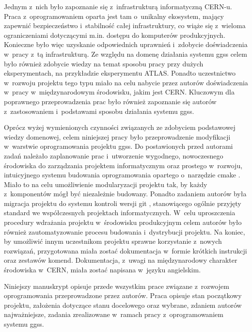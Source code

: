 Jednym z~nich było zapoznanie się z~infrastrukturą informatyczną CERN-u. Praca z~oprogramowaniem oparta jest tam o~unikalny ekosystem, mający zapewnić bezpieczeństwo i~stabilność całej infrastruktury, co wiąże się z~wieloma ograniczeniami dotyczącymi m.in. dostępu do komputerów produkcyjnych. Konieczne było więc uzyskanie odpowiednich uprawnień i~zdobycie doświadczenia w~pracy z~tą infrastrukturą. Ze względu na domenę działania systemu \gls*{ggss} celem było również zdobycie wiedzy na temat sposobu pracy przy dużych eksperymentach, na przykładzie eksperymentu ATLAS. Ponadto uczestnictwo w~rozwoju projektu tego typu miało na celu nabycie przez autorów doświadczenia w~pracy w~międzynarodowym środowisku, jakim jest CERN. Kluczowym dla poprawnego przeprowadzenia prac było również zapoznanie się autorów z~zastosowaniem i~podstawami sposobu działania systemu \gls*{ggss}. \par

Oprócz wyżej wymienionych czynności związanych ze zdobyciem podstawowej wiedzy domenowej, celem niniejszej pracy było przeprowadzenie modyfikacji w~warstwie oprogramowania projektu \gls*{ggss}. Do postawionych przed autorami zadań należało zaplanowanie prac i~utworzenie wygodnego, nowoczesnego środowiska do zarządzania projektem informatycznym oraz prostego w~rozwoju, intuicyjnego systemu budowania oprogramowania opartego o~narzędzie \gls*{cmake} \cite{CMakeMain}. Miało to na celu umożliwienie modularyzacji projektu tak, by każdy z~komponentów mógł być niezależnie budowany. Ponadto zadaniem autorów była migracja projektu do systemu kontroli wersji \gls*{git} \cite{GitMain}, stanowiącego ogólnie przyjęty standard we współczesnych projektach informatycznych. W~celu uproszczenia procedury wdrażania projektu w~środowisku produkcyjnym celem autorów było również zautomatyzowanie procesu budowania i~dystrybucji projektu. Na koniec, by umożliwić innym uczestnikom projektu sprawne korzystanie z~nowych rozwiązań, przygotowana miała zostać dokumentacja w~formie krótkich instrukcji oraz zestawów komend. Dokumentacja, z~uwagi na międzynarodowy charakter środowiska w~CERN, miała zostać napisana w~języku angielskim. \par

Niniejszy manuskrypt opisuje przede wszystkim prace związane z~rozwojem oprogramowania przeprowadzone przez autorów. Praca opisuje stan początkowy projektu, założenia dotyczące stanu docelowego oraz wybrane, zdaniem autorów najważniejsze, zadania zrealizowane w~ramach pracy z~oprogramowaniem systemu \gls*{ggss}.
